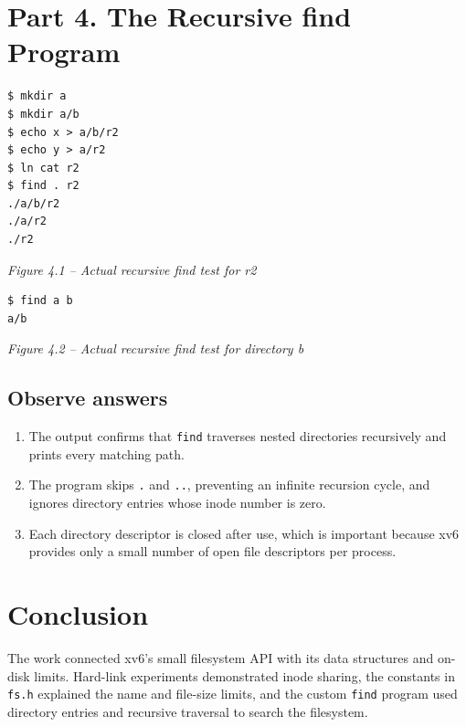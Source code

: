 \documentclass[12pt,a4paper]{article}
\newcommand{\figcap}[1]{\begin{center}\small\textit{#1}\end{center}\vspace{0.4em}}
\begin{document}
\section{Part 4. The Recursive find Program}
\begin{lstlisting}
$ mkdir a
$ mkdir a/b
$ echo x > a/b/r2
$ echo y > a/r2
$ ln cat r2
$ find . r2
./a/b/r2
./a/r2
./r2
\end{lstlisting}
\figcap{Figure 4.1 -- Actual recursive find test for r2}

\begin{lstlisting}
$ find a b
a/b
\end{lstlisting}
\figcap{Figure 4.2 -- Actual recursive find test for directory b}

\subsection{Observe answers}
\begin{enumerate}[label=\arabic*.]
\item The output confirms that \texttt{find} traverses nested directories recursively and prints every matching path.
\item The program skips \texttt{.} and \texttt{..}, preventing an infinite recursion cycle, and ignores directory entries whose inode number is zero.
\item Each directory descriptor is closed after use, which is important because xv6 provides only a small number of open file descriptors per process.
\end{enumerate}

\section{Conclusion}
The work connected xv6's small filesystem API with its data structures and on-disk limits. Hard-link experiments demonstrated inode sharing, the constants in \texttt{fs.h} explained the name and file-size limits, and the custom \texttt{find} program used directory entries and recursive traversal to search the filesystem.
\end{document}
